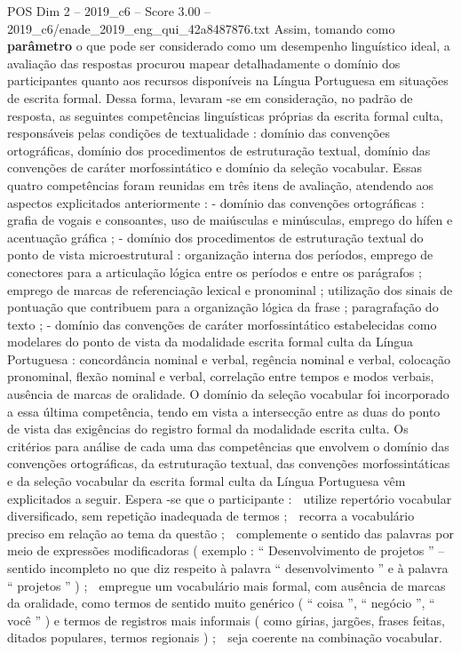 \begin{textsample}{POS Dim 2 – 2019\_c6 – Score 3.00 – 2019\_c6/enade\_2019\_eng\_qui\_42a8487876.txt}
Assim, tomando como \textbf{parâmetro} o que pode ser considerado como um desempenho linguístico ideal, a avaliação das respostas procurou mapear detalhadamente o domínio dos participantes quanto aos recursos disponíveis na Língua Portuguesa em situações de escrita formal.
Dessa forma, levaram -se em consideração, no padrão de resposta, as seguintes competências linguísticas próprias da escrita formal culta, responsáveis pelas condições de textualidade : domínio das convenções ortográficas, domínio dos procedimentos de estruturação textual, domínio das convenções de caráter morfossintático e domínio da seleção vocabular.
Essas quatro competências foram reunidas em três itens de avaliação, atendendo aos aspectos explicitados anteriormente : - domínio das convenções ortográficas : grafia de vogais e consoantes, uso de maiúsculas e minúsculas, emprego do hífen e acentuação gráfica ; - domínio dos procedimentos de estruturação textual do ponto de vista microestrutural : organização interna dos períodos, emprego de conectores para a articulação lógica entre os períodos e entre os parágrafos ; emprego de marcas de referenciação lexical e pronominal ; utilização dos sinais de pontuação que contribuem para a organização lógica da frase ; paragrafação do texto ; - domínio das convenções de caráter morfossintático estabelecidas como modelares do ponto de vista da modalidade escrita formal culta da Língua Portuguesa : concordância nominal e verbal, regência nominal e verbal, colocação pronominal, flexão nominal e verbal, correlação entre tempos e modos verbais, ausência de marcas de oralidade.
O domínio da seleção vocabular foi incorporado a essa última competência, tendo em vista a intersecção entre as duas do ponto de vista das exigências do registro formal da modalidade escrita culta.
Os critérios para análise de cada uma das competências que envolvem o domínio das convenções ortográficas, da estruturação textual, das convenções morfossintáticas e da seleção vocabular da escrita formal culta da Língua Portuguesa vêm explicitados a seguir.
Espera -se que o participante :  utilize repertório vocabular diversificado, sem repetição inadequada de termos ;  recorra a vocabulário preciso em relação ao tema da questão ;  complemente o sentido das palavras por meio de expressões modificadoras ( exemplo : “ Desenvolvimento de projetos ” – sentido incompleto no que diz respeito à palavra “ desenvolvimento ” e à palavra “ projetos ” ) ;  empregue um vocabulário mais formal, com ausência de marcas da oralidade, como termos de sentido muito genérico ( “ coisa ”, “ negócio ”, “ você ” ) e termos de registros mais informais ( como gírias, jargões, frases feitas, ditados populares, termos regionais ) ;  seja coerente na combinação vocabular.

\end{textsample}
